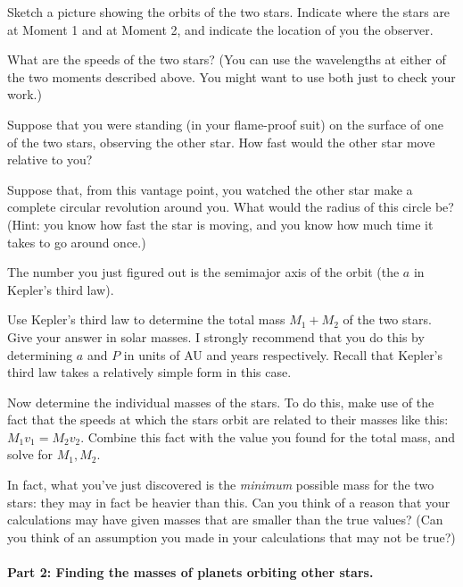 Sketch a picture showing the orbits of the two stars. Indicate
where the stars are at Moment 1 and at Moment 2, and indicate the location
of you the observer.

\vfil\eject

What are the speeds of the two stars? (You can use the wavelengths
at either of the two moments described above. You might want to use
both just to check your work.)

\vskip 2in

Suppose that you were standing (in your flame-proof suit) on the surface
of one of the two stars, observing the other star. How fast
would the other star move relative to you?

\vskip 1in

Suppose that, from this vantage point, you watched the other star
make a complete circular revolution around you. What would the
radius of this circle be? (Hint: you know how fast the star is moving,
and you know how much time it takes to go around once.)

\vskip 2in

The number you just figured out is the semimajor axis of the orbit (the $a$
in Kepler's third law).

Use Kepler's third law to determine the total mass $M_1+M_2$ of the
two stars. Give your answer in solar masses. I strongly recommend
that you do this by determining $a$ and $P$ in units of AU and years
respectively. Recall that Kepler's third law takes a relatively simple
form in this case.

\vskip 3in

Now determine the individual masses of the stars. To do this, make
use of the fact that the speeds at which the stars orbit
are related to their masses like this: $M_1v_1=M_2v_2$. Combine
this fact with the value you found for the total mass, and solve for
$M_1,M_2$.

\vskip 2in

In fact, what you've just discovered is the \textit{minimum} possible
mass for the two stars: they may in fact be heavier than this.
Can you think of a reason that your calculations may have given
masses that are smaller than the true values? (Can you think of an
assumption you made in your calculations that may not be true?)

\vskip 1in

\paragraph{Part 2: Finding the masses of planets orbiting other stars.}

